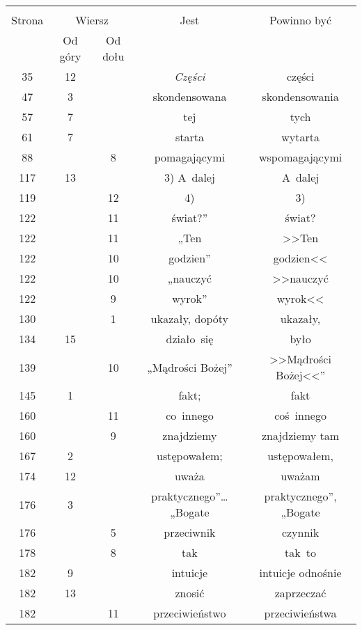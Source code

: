 \documentclass[a4paper,11pt]{article}
\begin{document}
\begin{center}

  \begin{tabular}{|c|c|c|c|c|}
    \hline
    & \multicolumn{2}{c|}{} & & \\
    Strona & \multicolumn{2}{c|}{Wiersz} & Jest
                              & Powinno być \\ \cline{2-3}
    & Od góry & Od dołu & & \\
    \hline
    35  & 12 & & \emph{Części} & części \\
    47  &  3 & & skondensowana & skondensowania \\
    57  &  7 & & tej & tych \\
    61  &  7 & & starta & wytarta \\
    88  & &  8 & pomagającymi & wspomagającymi \\
    117 & 13 & & 3) A~dalej & A~dalej \\
    119 & & 12 & 4) & 3) \\
    122 & & 11 & świat?” & świat? \\
    122 & & 11 & „Ten & >>Ten \\
    122 & & 10 & godzien” & godzien<<  %
    \\
    122 & & 10 & „nauczyć & >>nauczyć \\
    122 & &  9 & wyrok” & wyrok<<  %
    \\
    130 & &  1 & ukazały, dopóty & ukazały, \\
    134 & 15 & & działo~się & było \\
    139 & & 10 & „Mądrości Bożej” & >>Mądrości Bożej<<”  %
    \\
    145 &  1 & & fakt; & fakt \\
    160 & & 11 & co~innego & coś~innego \\
    160 & &  9 & znajdziemy & znajdziemy tam \\
    167 &  2 & & ustępowałem; & ustępowałem, \\
    174 & 12 & & uważa & uważam \\
    176 &  3 & & praktycznego”\ldots „Bogate & praktycznego”, „Bogate \\
    176 & &  5 & przeciwnik & czynnik \\
    178 & &  8 & tak & tak~to \\
    182 &  9 & & intuicje & intuicje odnośnie \\
    182 & 13 & & znosić & zaprzeczać \\
    182 & & 11 & przeciwieństwo & przeciwieństwa \\

\end{tabular}
\end{center}
\end{document}

